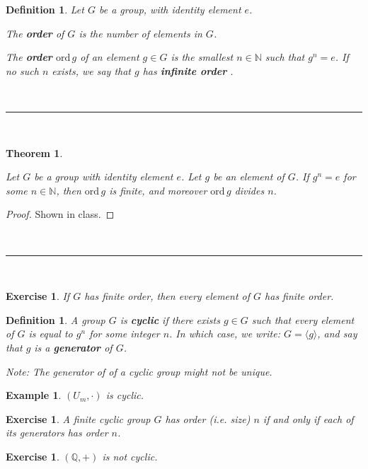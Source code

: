 \documentclass[a4paper,12pt]{report}
\newcommand{\ord}{\mathrm{ord}\,}
\renewcommand{\ord}{\mathrm{ord}\,}
\newcounter{statement}
\numberwithin{statement}{chapter}
\newtheorem{thm}[statement]{Theorem}
\newtheorem{defn}[statement]{Definition}
\newtheorem{eg}[statement]{\bf Example}
\newtheorem{ex}[statement]{\bf Exercise}
\numberwithin{equation}{chapter}
\numberwithin{section}{chapter}
\numberwithin{subsection}{section}
\begin{document}
\begin{defn}
Let $G$ be a group, with identity element $e$.



The  {\bf order}  of $G$ is the number of elements in $G$.



The  {\bf order}  $\ord g$ of an  element $g \in G$
is the smallest $n \in \mathbb{N}$ such that $g^n = e$.
If no such $n$ exists, we say that $g$ has  {\bf infinite order} .
\end{defn}




\quad\\\hrule
\quad\\

\begin{thm}
\label{thm:orderdividesn}



Let $G$ be a group with identity element $e$.
Let $g$ be an element of $G$.  If $g^n = e$ for some $n \in \mathbb{N}$,
then $\ord g$ is finite, and moreover $\ord g$ divides $n$.
\end{thm}
\begin{proof}
Shown in class.
\end{proof}

\quad\\\hrule
\quad\\




\begin{ex}

If $G$ has finite order, then every element of $G$ has finite order.

\end{ex}




\begin{defn}
A group $G$ is  {\bf cyclic}  if there exists $g \in G$ such that every element of $G$ is equal to $g^n$
for some integer $n$.
In which case, we write: $G = \langle g \rangle$, and say that $g$ is a  {\bf generator}  of $G$.


Note: The generator of of a cyclic group might not be unique.

\end{defn}
\begin{eg}


$(U_m, \cdot)$ is cyclic.

\end{eg}
\begin{ex}

A finite cyclic group $G$ has order (i.e. size) $n$
if and only if each of its generators has order $n$.

\end{ex}
\begin{ex}

$(\mathbb{Q}, +)$ is not cyclic.

\end{ex}
\end{document}
